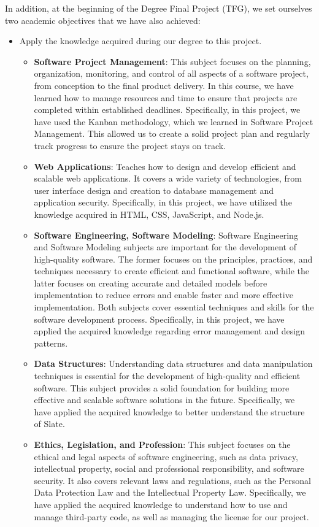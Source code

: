 In addition, at the beginning of the Degree Final Project (TFG), we set ourselves two academic objectives that we have also achieved:
\begin{itemize}
    \item Apply the knowledge acquired during our degree to this project.
    \begin{itemize}
        \item \textbf{Software Project Management}: This subject focuses on the planning, organization, monitoring, and control of all aspects of a software project, from conception to the final product delivery. In this course, we have learned how to manage resources and time to ensure that projects are completed within established deadlines. Specifically, in this project, we have used the Kanban methodology, which we learned in Software Project Management. This allowed us to create a solid project plan and regularly track progress to ensure the project stays on track.
        \item \textbf{Web Applications}: Teaches how to design and develop efficient and scalable web applications. It covers a wide variety of technologies, from user interface design and creation to database management and application security. Specifically, in this project, we have utilized the knowledge acquired in HTML, CSS, JavaScript, and Node.js.
        \item \textbf{Software Engineering, Software Modeling}: Software Engineering and Software Modeling subjects are important for the development of high-quality software. The former focuses on the principles, practices, and techniques necessary to create efficient and functional software, while the latter focuses on creating accurate and detailed models before implementation to reduce errors and enable faster and more effective implementation. Both subjects cover essential techniques and skills for the software development process. Specifically, in this project, we have applied the acquired knowledge regarding error management and design patterns.
        \item \textbf{Data Structures}: Understanding data structures and data manipulation techniques is essential for the development of high-quality and efficient software. This subject provides a solid foundation for building more effective and scalable software solutions in the future. Specifically, we have applied the acquired knowledge to better understand the structure of Slate.
        \item \textbf{Ethics, Legislation, and Profession}: This subject focuses on the ethical and legal aspects of software engineering, such as data privacy, intellectual property, social and professional responsibility, and software security. It also covers relevant laws and regulations, such as the Personal Data Protection Law and the Intellectual Property Law. Specifically, we have applied the acquired knowledge to understand how to use and manage third-party code, as well as managing the license for our project.

\end{itemize}
\end{itemize}

